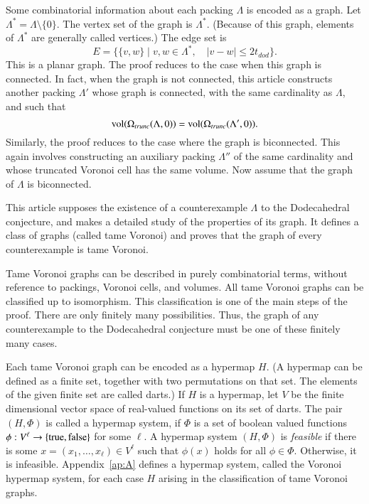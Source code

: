 Some combinatorial information about each packing $\Lambda$ is encoded
as a  graph.  Let $\Lambda^* = \Lambda\setminus\{0\}$. 
The vertex set of the graph is $\Lambda^*$.
(Because of this graph,  elements of $\Lambda^*$ are generally called vertices.)
The edge set is 
  $$
  E = \{\{v,w\} \mid v,w\in\Lambda^*,\quad   |v-w| \le 2t_{dod}\}.
  $$
This is a planar graph.  
The proof reduces to the case when this graph is connected.  In fact,
when the graph is not connected, this article constructs another packing
$\Lambda'$ whose graph is connected, with the same cardinality as $\Lambda$,
and such that
$$
   {\operatorname{vol}}(\Omega_{trunc}(\Lambda,0)) = {\operatorname{vol}}(\Omega_{trunc}(\Lambda',0)). 
$$
Similarly, the proof reduces to the case where the graph is biconnected.
  This again involves constructing an auxiliary 
packing $\Lambda''$ of the same cardinality and whose  truncated Voronoi cell has the same volume.  Now assume that the graph of $\Lambda$ is 
biconnected.

This article supposes the existence of a counterexample $\Lambda$ to the Dodecahedral
conjecture, and makes a detailed study of the properties of its
graph.  It defines a class of graphs (called tame Voronoi) and
proves that the graph of every counterexample is tame Voronoi.

Tame Voronoi graphs can be described in purely combinatorial
terms, without reference to packings, Voronoi cells, and volumes.
All tame Voronoi graphs can be classified up to isomorphism.
This classification is one of the main steps of the proof.
There are only finitely many possibilities.  Thus, the graph
of any counterexample
to the Dodecahedral conjecture must be one of these finitely
many cases.

Each tame Voronoi graph can be encoded as a hypermap $H$.  (A hypermap can be defined
as a finite set, together with two permutations on that set.  The elements
of the given finite set are called darts.)  If $H$ is a hypermap,
let $V$ be the finite dimensional
vector space of real-valued functions on its set of darts.
The pair $(H,\Phi)$ is called a hypermap system, if $\Phi$ is a set of boolean
valued functions $\phi:V^\ell \to \{{\operatorname{true}},{\operatorname{false}}\}$ for
some $\ell$.
A hypermap system $(H,\Phi)$ 
is {\it feasible} if there is some $x=(x_1,\ldots,x_\ell)\in V^\ell$
such that $\phi(x)$ holds for all $\phi\in\Phi$.  Otherwise,
it is infeasible.   Appendix~\ref{ap:A} defines
a hypermap system, called the Voronoi hypermap system, 
for each case $H$ arising in the classification of
tame Voronoi graphs.

